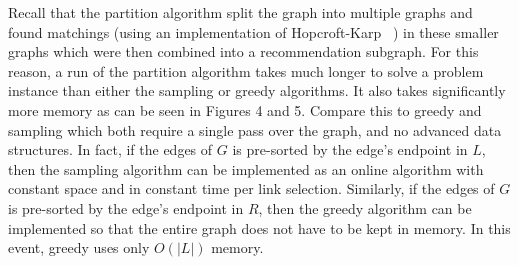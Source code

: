Recall that the partition algorithm split the graph into multiple graphs
and found matchings (using an implementation of Hopcroft-Karp ~\cite{HopcroftKarp})
in these smaller graphs which were then combined into
a recommendation subgraph. For this reason, a run of the partition
algorithm takes much longer to solve a problem instance than either the
sampling or greedy algorithms. It also takes significantly more memory as can be seen in Figures 4 and 5.
Compare this to greedy and sampling which both require a single pass over
the graph, and no advanced data structures. In fact, if the edges
of $G$ is pre-sorted by the edge's endpoint in $L$, then the sampling algorithm can be
implemented as an online algorithm with constant space and in constant time
per link selection. Similarly, if the edges of $G$
is pre-sorted by the edge's endpoint in $R$, then the greedy algorithm can
be implemented so that the entire graph does not have to be kept in memory. In this
event, greedy uses only $O(|L|)$ memory.  

